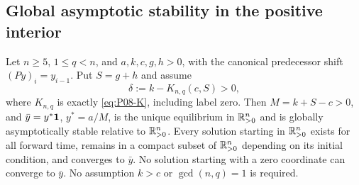 \subsection{Global asymptotic stability in the positive interior}
\begin{theorem}
\label{thm:P08-global-interior}
Let $n\ge5$, $1\le q<n$, and $a,k,c,g,h>0$, with the canonical
predecessor shift $(Py)_i=y_{i-1}$. Put $S=g+h$ and assume
\[
 \delta:=k-K_{n,q}(c,S)>0,
\]
where $K_{n,q}$ is exactly \eqref{eq:P08-K}, including label zero.
Then $M=k+S-c>0$, and $\bar y=y^*\mathbf{1}$, $y^*=a/M$, is the unique
equilibrium in $\mathbb{R}_{>0}^{n}$ and is globally asymptotically stable relative
to $\mathbb{R}_{>0}^{n}$. Every solution starting in $\mathbb{R}_{>0}^{n}$ exists for all
forward time, remains in a compact subset of $\mathbb{R}_{>0}^{n}$ depending on
its initial condition, and converges to $\bar y$.
No solution starting with a zero coordinate can converge to $\bar y$.
No assumption $k>c$ or $\gcd(n,q)=1$ is required.
\end{theorem}
